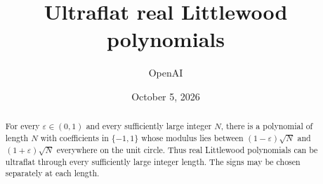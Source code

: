\documentclass[11pt]{article}
\title{Ultraflat real Littlewood polynomials}
\author{OpenAI}
\date{October 5, 2026}
\theoremstyle{remark}
\numberwithin{equation}{section}
\begin{document}
\maketitle
\begin{abstract}
For every $\varepsilon\in(0,1)$ and every sufficiently large integer $N$,
there is a polynomial of length $N$ with coefficients in $\{-1,1\}$ whose
modulus lies between $(1-\varepsilon)\sqrt N$ and
$(1+\varepsilon)\sqrt N$ everywhere on the unit circle. Thus real
Littlewood polynomials can be ultraflat through every sufficiently large
integer length. The signs may be chosen separately at each length.
\end{abstract}








\end{document}
